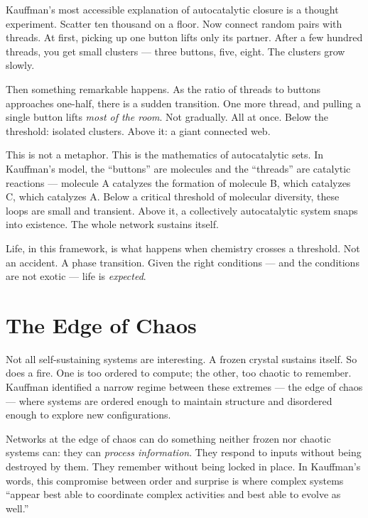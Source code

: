 Kauffman's most accessible explanation of autocatalytic closure is a thought experiment. Scatter ten thousand  on a floor. Now connect random pairs with threads. At first, picking up one button lifts only its partner. After a few hundred threads, you get small clusters --- three buttons, five, eight. The clusters grow slowly.

Then something remarkable happens. As the ratio of threads to buttons approaches one-half, there is a sudden transition. One more thread, and pulling a single button lifts \textit{most of the room}. Not gradually. All at once. Below the threshold: isolated clusters. Above it: a giant connected web.

This is not a metaphor. This is the mathematics of autocatalytic sets. In Kauffman's model, the ``buttons'' are molecules and the ``threads'' are catalytic reactions --- molecule A catalyzes the formation of molecule B, which catalyzes C, which catalyzes A\@. Below a critical threshold of molecular diversity, these loops are small and transient. Above it, a collectively autocatalytic system snaps into existence. The whole network sustains itself.

Life, in this framework, is what happens when chemistry crosses a threshold. Not an accident. A phase transition. Given the right conditions --- and the conditions are not exotic --- life is \textit{expected}.

\section*{The Edge of Chaos}
\label{spine:gen-the-edge-of-chaos}


Not all self-sustaining systems are interesting. A frozen crystal sustains itself. So does a fire. One is too ordered to compute; the other, too chaotic to remember. Kauffman identified a narrow regime between these extremes --- the edge of chaos --- where systems are ordered enough to maintain structure and disordered enough to explore new configurations.

Networks at the edge of chaos can do something neither frozen nor chaotic systems can: they can \textit{process information}. They respond to inputs without being destroyed by them. They remember without being locked in place. In Kauffman's words, this compromise between order and surprise is where complex systems ``appear best able to coordinate complex activities and best able to evolve as well.''

